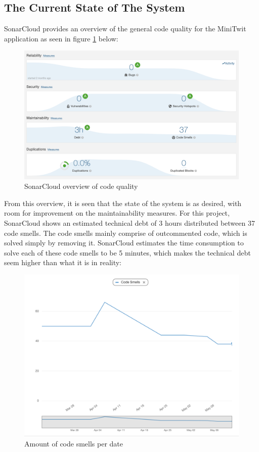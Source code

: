 \subsection{The Current State of The System}
SonarCloud provides an overview of the general code quality for the MiniTwit application as seen in figure \ref{fig:sonarcloud} below:

\begin{figure}[H]
    \centering
    \includegraphics[width=0.90\linewidth]{report/images/SonarCloudOverview.png}
    \caption{SonarCloud overview of code quality}
    \label{fig:sonarcloud}
\end{figure}

\noindent
From this overview, it is seen that the state of the system is as desired, with room for improvement on the maintainability measures. For this project, SonarCloud shows an estimated technical debt of 3 hours distributed between 37 code smells. The code smells mainly comprise of outcommented code, which is solved simply by removing it. SonarCloud estimates the time consumption to solve each of these code smells to be 5 minutes, which makes the technical debt seem higher than what it is in reality:

\begin{figure}[H]
    \centering
    \includegraphics[width=0.90\linewidth, height=0.6\linewidth]{report/images/SonarCloudCodeSmells.png}
    \caption{Amount of code smells per date}
    \label{fig:sonarcloudsmells}
\end{figure}

